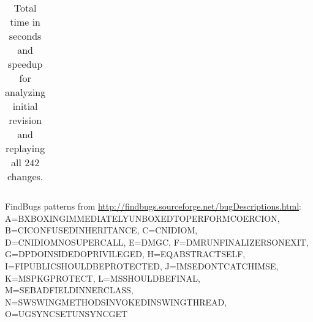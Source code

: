 \begin{table}
\begin{center}
\begin{tabular}{ l r r r }
\bottomrule
\end{tabular}
\end{center}
{\tiny FindBugs patterns from \href{http://findbugs.sourceforge.net/bugDescriptions.html}{http://findbugs.sourceforge.net/bugDescriptions.html}: A=BX\textunderscore\allowbreak{}BOXING\textunderscore\allowbreak{}IMMEDIATELY\textunderscore\allowbreak{}UNBOXED\textunderscore\allowbreak{}TO\textunderscore\allowbreak{}PERFORM\textunderscore\allowbreak{}COERCION, B=CI\textunderscore\allowbreak{}CONFUSED\textunderscore\allowbreak{}INHERITANCE, C=CN\textunderscore\allowbreak{}IDIOM, D=CN\textunderscore\allowbreak{}IDIOM\textunderscore\allowbreak{}NO\textunderscore\allowbreak{}SUPER\textunderscore\allowbreak{}CALL, E=DM\textunderscore\allowbreak{}GC, F=DM\textunderscore\allowbreak{}RUN\textunderscore\allowbreak{}FINALIZERS\textunderscore\allowbreak{}ON\textunderscore\allowbreak{}EXIT, G=DP\textunderscore\allowbreak{}DO\textunderscore\allowbreak{}INSIDE\textunderscore\allowbreak{}DO\textunderscore\allowbreak{}PRIVILEGED, H=EQ\textunderscore\allowbreak{}ABSTRACT\textunderscore\allowbreak{}SELF, I=FI\textunderscore\allowbreak{}PUBLIC\textunderscore\allowbreak{}SHOULD\textunderscore\allowbreak{}BE\textunderscore\allowbreak{}PROTECTED, J=IMSE\textunderscore\allowbreak{}DONT\textunderscore\allowbreak{}CATCH\textunderscore\allowbreak{}IMSE, K=MS\textunderscore\allowbreak{}PKGPROTECT, L=MS\textunderscore\allowbreak{}SHOULD\textunderscore\allowbreak{}BE\textunderscore\allowbreak{}FINAL, M=SE\textunderscore\allowbreak{}BAD\textunderscore\allowbreak{}FIELD\textunderscore\allowbreak{}INNER\textunderscore\allowbreak{}CLASS, N=SW\textunderscore\allowbreak{}SWING\textunderscore\allowbreak{}METHODS\textunderscore\allowbreak{}INVOKED\textunderscore\allowbreak{}IN\textunderscore\allowbreak{}SWING\textunderscore\allowbreak{}THREAD, O=UG\textunderscore\allowbreak{}SYNC\textunderscore\allowbreak{}SET\textunderscore\allowbreak{}UNSYNC\textunderscore\allowbreak{}GET\par}
\caption{Total time in seconds and speedup for analyzing initial revision and replaying all $242$ changes.}
\label{tbl:analysisbenchmarks}
\end{table}

